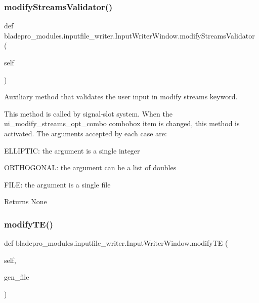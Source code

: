 \subsubsection{\texorpdfstring{modify\+Streams\+Validator()}{modifyStreamsValidator()}}
{\footnotesize\ttfamily def bladepro\+\_\+modules.\+inputfile\+\_\+writer.\+Input\+Writer\+Window.\+modify\+Streams\+Validator (\begin{DoxyParamCaption}\item[{}]{self }\end{DoxyParamCaption})}



Auxiliary method that validates the user input in modify streams keyword. 

This method is called by signal-\/slot system. When the ui\+\_\+modify\+\_\+streams\+\_\+opt\+\_\+combo combobox item is changed, this method is activated. The arguments accepted by each case are\+:

\begin{DoxyItemize}
\item {\ttfamily E\+L\+L\+I\+P\+T\+IC\+:} the argument is a single integer \item {\ttfamily O\+R\+T\+H\+O\+G\+O\+N\+AL\+:} the argument can be a list of doubles \item {\ttfamily F\+I\+LE\+:} the argument is a single file\end{DoxyItemize}
\begin{DoxyReturn}{Returns}
None 
\end{DoxyReturn}
\hypertarget{a00073_a52d4edd27f78b5559e6e3683c6adb3bc}{}\label{a00073_a52d4edd27f78b5559e6e3683c6adb3bc} 
\subsubsection{\texorpdfstring{modify\+T\+E()}{modifyTE()}}
{\footnotesize\ttfamily def bladepro\+\_\+modules.\+inputfile\+\_\+writer.\+Input\+Writer\+Window.\+modify\+TE (\begin{DoxyParamCaption}\item[{}]{self,  }\item[{}]{gen\+\_\+file }\end{DoxyParamCaption})}



